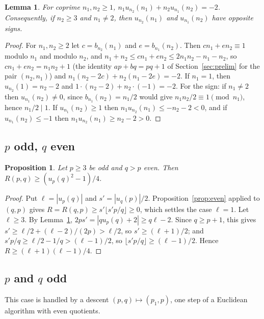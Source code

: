 \documentclass[11pt,reqno]{amsart}
\theoremstyle{plain}
\newtheorem{proposition}[theorem]{Proposition}
\newtheorem{lemma}[theorem]{Lemma}
\theoremstyle{definition}
\begin{document}
\begin{lemma}\label{lem:recip}
For coprime $n_1,n_2\ge1$, $n_1u_{n_2}(n_1)+n_2u_{n_1}(n_2)=-2$. Consequently, if $n_2\ge3$ and $n_1\neq2$,
then $u_{n_2}(n_1)$ and $u_{n_1}(n_2)$ have opposite signs.
\end{lemma}

\begin{proof}
For $n_1,n_2\ge2$ let $c=b_{n_2}(n_1)$ and $e=b_{n_1}(n_2)$. Then $cn_1+en_2\equiv1$ modulo $n_1$ and modulo
$n_2$, and $n_1+n_2\le cn_1+en_2\le2n_1n_2-n_1-n_2$, so $cn_1+en_2=n_1n_2+1$ (the identity $ap+bq=pq+1$ of Section~\ref{sec:prelim} for the pair
$(n_2,n_1)$) and
$n_1(n_2-2c)+n_2(n_1-2e)=-2$. If $n_1=1$, then $u_{n_2}(1)=n_2-2$ and $1\cdot(n_2-2)+n_2\cdot(-1)=-2$. For
the sign: if $n_1\neq2$ then $u_{n_1}(n_2)\neq0$, since $b_{n_1}(n_2)=n_1/2$ would give
$n_1n_2/2\equiv1\pmod{n_1}$, hence $n_1/2\mid1$. If $u_{n_1}(n_2)\ge1$ then $n_1u_{n_2}(n_1)\le-n_2-2<0$, and if
$u_{n_1}(n_2)\le-1$ then $n_1u_{n_2}(n_1)\ge n_2-2>0$.
\end{proof}

\subsection{\texorpdfstring{$p$ odd, $q$ even}{p odd, q even}}

\begin{proposition}\label{prop:oddeven}
Let $p\ge3$ be odd and $q>p$ even. Then $R(p,q)\ge(u_p(q)^2-1)/4$.
\end{proposition}

\begin{proof}
Put $\ell=|u_p(q)|$ and $s'=|u_q(p)|/2$. Proposition~\ref{prop:even} applied to $(q,p)$ gives
$R=R(q,p)\ge s'\lfloor s'p/q\rfloor\ge0$, which settles the case $\ell=1$. Let $\ell\ge3$. By
Lemma~\ref{lem:recip}, $2ps'=|qu_p(q)+2|\ge q\ell-2$. Since $q\ge p+1$, this gives
$s'\ge\ell/2+(\ell-2)/(2p)>\ell/2$, so $s'\ge(\ell+1)/2$; and $s'p/q\ge\ell/2-1/q>(\ell-1)/2$, so
$\lfloor s'p/q\rfloor\ge(\ell-1)/2$. Hence $R\ge(\ell+1)(\ell-1)/4$.
\end{proof}

\subsection{\texorpdfstring{$p$ and $q$ odd}{p and q odd}}
This case is handled by a descent $(p,q)\mapsto(p_1,p)$, one step of a Euclidean algorithm with even
quotients.
\end{document}
